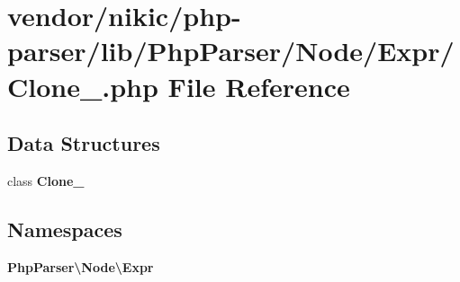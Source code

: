 \section{vendor/nikic/php-\/parser/lib/\+Php\+Parser/\+Node/\+Expr/\+Clone\+\_\+.php File Reference}
\label{_clone___8php}
\subsection*{Data Structures}
\begin{DoxyCompactItemize}
\item 
class {\bf Clone\+\_\+}
\end{DoxyCompactItemize}
\subsection*{Namespaces}
\begin{DoxyCompactItemize}
\item 
 {\bf Php\+Parser\textbackslash{}\+Node\textbackslash{}\+Expr}
\end{DoxyCompactItemize}
